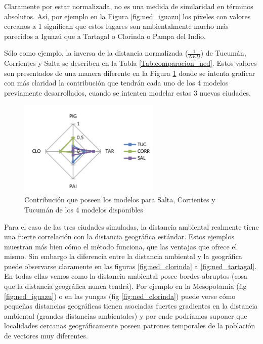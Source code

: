   \par Claramente por estar normalizada, no es una medida de similaridad en
    términos absolutos. Así, por ejemplo en la Figura \ref{fig:ned_iguazu} los
    píxeles con valores
    cercanos a 1 significan que estos lugares son ambientalmente mucho más
    parecidos a Iguazú que a Tartagal o Clorinda o Pampa del Indio.


  \par Sólo como ejemplo, la inversa de la distancia normalizada ($\frac{1}{NED}$)
    de Tucumán, Corrientes y Salta se describen en la Tabla \ref{Tab:comparacion_ned}.
    Estos valores son presentados de una manera diferente en la Figura \ref{fig:ned_contrib}
    donde se intenta graficar con más claridad la contribución que tendrán cada
    uno de los 4 modelos previamente desarrollados, cuando se intenten modelar
    estas 3 nuevas ciudades.
    \begin{figure}[hbt]
      \centering%
      \includegraphics[width=0.6\textwidth]{images/ned_contrib}%
      \caption{Contribución que poseen los modelos para Salta, Corrientes y
              Tucumán de los 4 modelos disponibles}\label{fig:ned_contrib}
    \end{figure}

  \par Para el caso de las tres ciudades simuladas, la distancia ambiental
    realmente tiene una fuerte correlación con la distancia geográfica estándar.
    Estos ejemplos muestran más bien cómo el método funciona, que las ventajas
    que ofrece el mismo. Sin embargo la diferencia entre la distancia ambiental
    y la geográfica puede observarse claramente en las figuras \ref{fig:ned_clorinda}
    a \ref{fig:ned_tartagal}.
    En todas ellas vemos como la distancia ambiental posee bordes abruptos
    (cosa que la distancia geográfica nunca tendrá).
    Por ejemplo en la Mesopotamia (fig \ref{fig:ned_iguazu}) o en las yungas
    (fig \ref{fig:ned_clorinda}) puede verse
    cómo pequeñas distancias geográficas tienen asociadas fuertes gradientes en
    la distancia ambiental (grandes distancias ambientales) y por ende
    podríamos suponer que localidades cercanas geográficamente poseen patrones
    temporales de la población de vectores muy diferentes.

